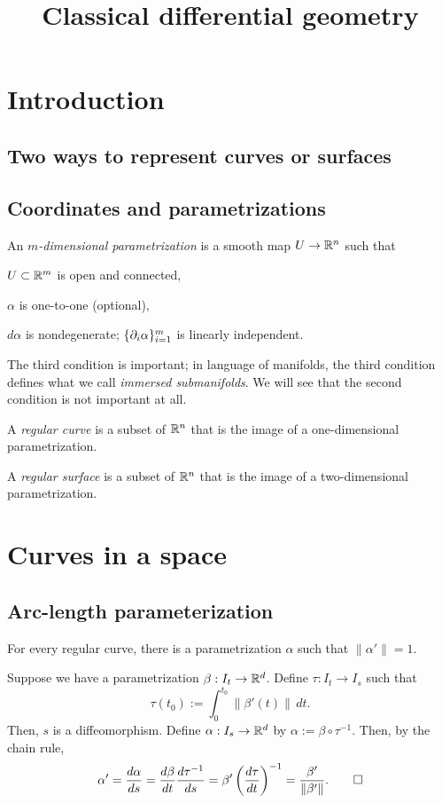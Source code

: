 \documentclass{../exp}
\title{Classical differential geometry}
\def\a{\alpha}
\begin{document}
\maketitle

\section{Introduction}
\subsection{Two ways to represent curves or surfaces}

\subsection{Coordinates and parametrizations}
\begin{defn}
An \emph{$m$-dimensional parametrization} is a smooth map $U\to\R^n$ such that
\begin{cond}
\item $U\subset\mathbb{R}^m$ is open and connected,
\item $\a$ is one-to-one (optional),
\item $d\a$ is nondegenerate; $\{\pd_i\a\}_{i=1}^m$ is linearly independent.
\end{cond}
\end{defn}
The third condition is important; in language of manifolds, the third condition defines what we call \emph{immersed submanifolds}.
We will see that the second condition is not important at all.

\begin{defn}
A \emph{regular curve} is a subset of $\mathbb{R}^n$ that is the image of a one-dimensional parametrization.
\end{defn}
\begin{defn}
A \emph{regular surface} is a subset of $\mathbb{R}^n$ that is the image of a two-dimensional parametrization.
\end{defn}





\section{Curves in a space}
\subsection{Arc-length parameterization}
\begin{thm}
For every regular curve, there is a parametrization $\a$ such that $\|\a'\|=1$.
\end{thm}
\begin{pf}
Suppose we have a parametrization $\beta:I_t\to\R^d$.
Define $\tau:I_t\to I_s$ such that
\[\tau(t_0):=\int_0^{t_0}\|\beta'(t)\|\,dt.\]
Then, $s$ is a diffeomorphism.
Define $\a:I_s\to\R^d$ by $\a:=\beta\circ\tau^{-1}$.
Then, by the chain rule,
\[\a'=\dd{\a}{s}=\dd{\beta}{t}\dd{\tau^{-1}}{s}=\beta'\left(\dd{\tau}{t}\right)^{-1}=\frac{\beta'}{\|\beta'\|}.\qedhere\]
\end{pf}
\end{document}
